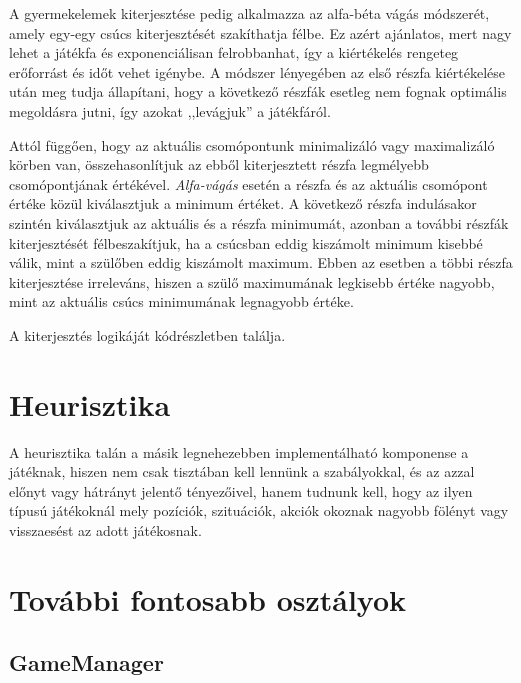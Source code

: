 \documentclass[
]{thesis-ekf}
\theoremstyle{definition}
\theoremstyle{remark}
\begin{document}
A gyermekelemek kiterjesztése pedig alkalmazza az alfa-béta vágás módszerét, amely egy-egy csúcs kiterjesztését szakíthatja félbe. Ez azért ajánlatos, mert nagy lehet a játékfa és exponenciálisan felrobbanhat, így a kiértékelés rengeteg erőforrást és időt vehet igénybe. A módszer lényegében az első részfa kiértékelése után meg tudja állapítani, hogy a következő részfák esetleg nem fognak optimális megoldásra jutni, így azokat ,,levágjuk'' a játékfáról.

Attól függően, hogy az aktuális csomópontunk minimalizáló vagy maximalizáló körben van, összehasonlítjuk az ebből kiterjesztett részfa legmélyebb csomópontjának értékével. \emph{Alfa-vágás} esetén a részfa és az aktuális csomópont értéke közül kiválasztjuk a minimum értéket. A következő részfa indulásakor szintén kiválasztjuk az aktuális és a részfa minimumát, azonban a további részfák kiterjesztését félbeszakítjuk, ha a csúcsban eddig kiszámolt minimum kisebbé válik, mint a szülőben eddig kiszámolt maximum. Ebben az esetben a többi részfa kiterjesztése irreleváns, hiszen a szülő maximumának legkisebb értéke nagyobb, mint az aktuális csúcs minimumának legnagyobb értéke. \cite[5.6. fejezet]{KovasznaiKusper} 

A kiterjesztés logikáját  kódrészletben találja.




\section{Heurisztika} \label{heuristics}
A heurisztika talán a másik legnehezebben implementálható komponense a játéknak, hiszen nem csak tisztában kell lennünk a szabályokkal, és az azzal előnyt vagy hátrányt jelentő tényezőivel, hanem tudnunk kell, hogy az ilyen típusú játékoknál mely pozíciók, szituációk, akciók okoznak nagyobb fölényt vagy visszaesést az adott játékosnak. 

\section{További fontosabb osztályok} 

\subsection{GameManager} \label{gamemanager}
\end{document}
